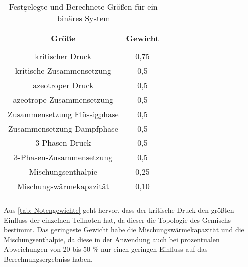 \documentclass[../thesis.tex]{subfiles}
\begin{document}
\begin{table} [htb]
	\centering
	\caption{Festgelegte und Berechnete Größen für ein binäres System}
	\begin{tabular}{ cc }
		\hline 
		Größe & Gewicht \\
		\hline  \\ 
		[\dimexpr-\normalbaselineskip+2pt]
		kritischer Druck  & 0,75   \\
		kritische Zusammensetzung  & 0,5   \\
		azeotroper Druck  & 0,5  \\
		azeotrope Zusammensetzung  & 0,5  \\
		Zusammensetzung Flüssigphase & 0,5 \\
		Zusammensetzung Dampfphase & 0,5 \\
		3-Phasen-Druck & 0,5   \\
		3-Phasen-Zusammensetzung & 0,5  \\
		Mischungsenthalpie & 0,25 \\
		Mischungswärmekapazität & 0,10 \\
		[\dimexpr-\normalbaselineskip+18pt]
		\hline
		\label{tab: Notengewichte}
	\end{tabular}
\end{table}

Aus \autoref{tab: Notengewichte} geht hervor, dass der kritische Druck den größten Einfluss der einzelnen Teilnoten hat, da dieser die Topologie des Gemischs bestimmt. Das geringeste Gewicht habe die Mischungswärmekapazität und die Mischungsenthalpie, da diese in der Anwendung auch bei prozentualen Abweichungen von 20 bis 50 \% nur einen geringen Einfluss auf das Berechnungsergebniss haben.
\end{document}
